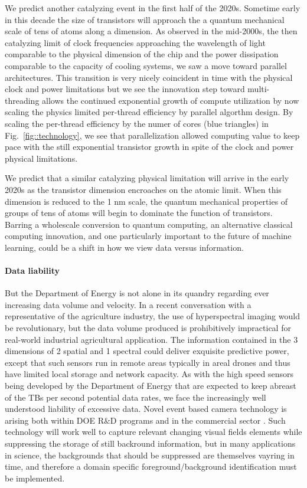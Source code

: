 \documentclass{article}
\begin{document}
We predict another catalyzing event in the first half of the 2020s.
Sometime early in this decade the size of transistors will approach the a quantum mechanical scale of tens of atoms along a dimension.
As observed in the mid-2000s, the then catalyzing limit of clock frequencies approaching the wavelength of light comparable to the physical dimension of the chip and the power dissipation comparable to the capacity of cooling systems, we saw a move toward parallel architectures. 
This transition is very nicely coincident in time with the physical clock and power limitations but we see the innovation step toward multi-threading allows the continued exponential growth of compute utilization by now scaling the physics limited per-thread efficiency by parallel algorthm design.
By scaling the per-thread efficiency by the numer of cores (blue triangles) in Fig.~\ref{fig::technology}, we see that parallelization allowed computing value to keep pace with the still exponential transistor growth in spite of the clock and power physical limitations.

We predict that a similar catalyzing physical limitation will arrive in the early 2020s as the transistor dimension encroaches on the atomic limit.
When this dimension is reduced to the 1 nm scale, the quantum mechanical properties of groups of tens of atoms will begin to dominate the function of transistors.
Barring a wholescale conversion to quantum computing, an alternative classical computing innovation, and one particularly important to the future of machine learning, could be a shift in how we view data versus information.

\paragraph{Data liability}
But the Department of Energy is not alone in its quandry regarding ever increasing data volume and velocity.
In a recent conversation with a representative of the agriculture industry, the use of hyperspectral imaging would be revolutionary, but the data volume produced is prohibitively impractical for real-world industrial agricultural application.
The information contained in the 3 dimensions of 2 spatial and 1 spectral could deliver exquisite predictive power, except that such sensors run in remote areas typically in areal drones and thus have limited local storage and network capacity.
As with the high speed sensors being developed by the Department of Energy that are expected to keep abreast of the TBs per second potential data rates, we face the increasingly well understood liability of excessive data. 
Novel event based camera technology is arising both within DOE R\&D programs and in the commercial sector \cite{Prophesee}.  
Such technology will work well to capture relevant changing visual fields elements while suppressing the storage of still backround information, but in many applications in science, the backgrounds that should be suppressed are themselves vayring in time, and therefore a domain specific foreground/background identification must be implemented.
\end{document}
